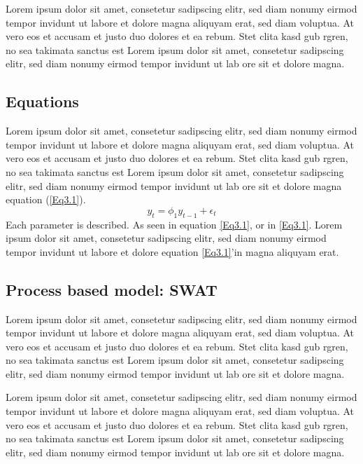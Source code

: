 Lorem ipsum dolor sit amet, consetetur sadipscing elitr, sed diam nonumy eirmod tempor invidunt ut labore et dolore magna aliquyam erat, sed diam voluptua. At vero eos et accusam et justo duo dolores et ea rebum. Stet clita kasd gub rgren, no sea takimata sanctus est Lorem ipsum dolor sit amet, consetetur sadipscing elitr, sed diam nonumy eirmod tempor invidunt ut lab ore sit et dolore magna.

\subsection{Equations}

Lorem ipsum dolor sit amet, consetetur sadipscing elitr, sed diam nonumy eirmod tempor invidunt ut labore et dolore magna aliquyam erat, sed diam voluptua. At vero eos et accusam et justo duo dolores et ea rebum. Stet clita kasd gub rgren, no sea takimata sanctus est  Lorem ipsum dolor sit amet, consetetur sadipscing elitr, sed diam nonumy eirmod tempor invidunt ut lab  ore sit et dolore magna equation (\ref{Eq3.1}).
\begin{equation}
y_{t} = \phi_{1} y_{t-1} + \epsilon_{t}
\label{Eq3.1}
\end{equation}
Each parameter is described. As seen in equation \eqref{Eq3.1}, or in \ref{Eq3.1}. Lorem ipsum dolor sit amet, consetetur sadipscing elitr, sed diam nonumy eirmod tempor invidunt ut labore et dolore equation \ref{Eq3.1}’in magna aliquyam erat.

\subsection{Process based model: SWAT}

Lorem ipsum dolor sit amet, consetetur sadipscing elitr, sed diam nonumy eirmod tempor invidunt ut labore et dolore magna aliquyam erat, sed diam voluptua. At vero eos et accusam et justo duo dolores et ea rebum. Stet clita kasd gub rgren, no sea takimata sanctus est Lorem ipsum dolor sit amet, consetetur sadipscing elitr, sed diam nonumy eirmod tempor invidunt ut lab ore sit et dolore magna.

Lorem ipsum dolor sit amet, consetetur sadipscing elitr, sed diam nonumy eirmod tempor invidunt ut labore et dolore magna aliquyam erat, sed diam voluptua. At vero eos et accusam et justo duo dolores et ea rebum. Stet clita kasd gub rgren, no sea takimata sanctus est Lorem ipsum dolor sit amet, consetetur sadipscing elitr, sed diam nonumy eirmod tempor invidunt ut lab ore sit et dolore magna.

